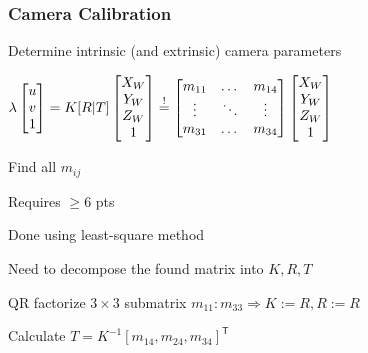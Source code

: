 \documentclass[a4paper]{article}
\newcommand{\transpose}{\mathsf{T}}
\begin{document}
\subsubsection{Camera Calibration}
\begin{itemize*}
    \item Determine intrinsic (and extrinsic) camera parameters
    \item $\lambda
        \begin{bmatrix}
            u\\
            v\\
            1
        \end{bmatrix} = K [R|T]
        \begin{bmatrix}
            X_W\\
            Y_W\\
            Z_W\\
            1
        \end{bmatrix} \overset{!}{=} \linebreak
        \begin{bmatrix}
            m_{11} & \dots & m_{14}\\
            \vdots & \ddots & \vdots\\
            m_{31} & \dots & m_{34}
        \end{bmatrix}
        \begin{bmatrix}
            X_W\\
            Y_W\\
            Z_W\\
            1
        \end{bmatrix}$
    \item Find all $m_{ij}$
    \item Requires $\ge 6$ pts
    \item Done using least-square method
    \item Need to decompose the found matrix into $K, R, T$
    \item QR factorize $3 \times 3$ submatrix $m_{11}:m_{33} \Rightarrow K := R, R := R$
    \item Calculate $T = K^{-1}[m_14, m_{24}, m_{34}]^\transpose$
\end{itemize*}
\end{document}

